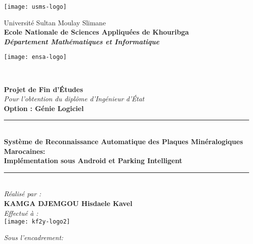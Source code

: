 \begin{titlepage}
\begin{minipage}{2cm}
	\begin{flushleft}
		\texttt{[image: usms-logo]}
	\end{flushleft}
\end{minipage}\hfill
\begin{minipage}{12cm}
	\begin{center}
		Université Sultan Moulay Slimane\\
		\textbf{Ecole Nationale de Sciences Appliquées de Khouribga}\\
		\textit{\textbf{Département Mathématiques et Informatique}}
	\end{center}
\end{minipage}\hfill
\begin{minipage}{2cm}
	\begin{flushright}
		\texttt{[image: ensa-logo]}
	\end{flushright}
\end{minipage}\\
\begin{center}
{\large \bfseries Projet de Fin d’Études}\\[0.5cm]
{\large \textit{Pour l'obtention du diplôme d'Ingénieur d'État}}\\[0.5cm]
{\large \bfseries{Option : Génie Logiciel} \\ }
\vspace{10mm}
\rule{0.95\textwidth}{2pt}\vspace{0.9\baselineskip}\\
			{\Large \textrm{\textbf{Système de Reconnaissance Automatique des Plaques Minéralogiques Marocaines: \\Implémentation sous Android et Parking Intelligent}}}
\rule{0.95\textwidth}{2pt}\\
\vspace{10mm}
\emph{Réalisé par :}\\[0.5cm]
\large \textbf{\textsc{KAMGA DJEMGOU} Hisdaele Kavel}\\
\vspace{10mm}
\emph{Effectué à :}\\[0.5cm]
\texttt{[image: kf2y-logo2]}
\end{center}
\begin{center}
	\emph{Sous l'encadrement: }
\end{center}
\noindent
\begin{minipage}{0.4\textwidth}

\end{minipage}
\end{titlepage}
